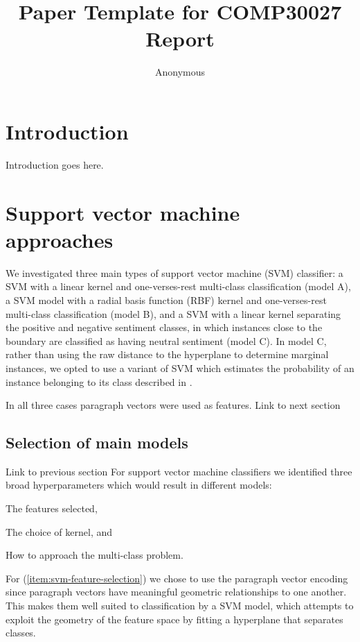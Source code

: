 \documentclass[11pt]{article}
\title{Paper Template for COMP30027 Report}
\author
{Anonymous}
\newcommand{\drafting}[1]{\textcolor{OliveGreen}{#1}}
\begin{document}
\maketitle



\section{Introduction}
\drafting{
Introduction goes here.
}

\section{Support vector machine approaches}
We investigated three main types of support vector machine (SVM) classifier: a SVM with a linear kernel and one-verses-rest multi-class classification (model A), a SVM model with a radial basis function (RBF) kernel and one-verses-rest multi-class classification (model B), and a SVM with a linear kernel separating the positive and negative sentiment classes, in which instances close to the boundary are classified as having neutral sentiment (model C). In model C, rather than using the raw distance to the hyperplane to determine marginal instances, we opted to use a variant of SVM which estimates the probability of an instance belonging to its class described in \cite{platt_probabilistic_1999}. 

In all three cases paragraph vectors were used as features. \drafting{Link to next section}

\subsection{Selection of main models}
\drafting{Link to previous section}
For support vector machine classifiers we identified three broad hyperparameters which would result in different models: \begin{enumerate*}
	\item The features selected, \label{item:svm-feature-selection}
	\item The choice of kernel, and \label{item:svm-kernel}
	\item How to approach the multi-class problem. \label{item:svm-multiclass-v-binary}
\end{enumerate*}

For (\ref{item:svm-feature-selection}) we chose to use the paragraph vector encoding \cite{le_distributed_2014} since paragraph vectors have meaningful geometric relationships to one another. This makes them well suited to classification by a SVM model, which attempts to exploit the geometry of the feature space by fitting a hyperplane that separates classes. 
\end{document}
